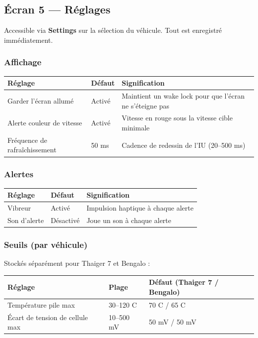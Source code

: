 \documentclass[11pt,a4paper,oneside]{report}
\newcommand{\degC}{\textdegree C}
\begin{document}
\subsection{Écran 5 --- Réglages}
Accessible via \textbf{Settings} sur la sélection du véhicule. Tout est enregistré
immédiatement.

\subsubsection{Affichage}

\begin{tabularx}{\linewidth}{@{}llL@{}}
\toprule
\textbf{Réglage} & \textbf{Défaut} & \textbf{Signification}\\
\midrule
Garder l'écran allumé & Activé & Maintient un wake lock pour que l'écran ne s'éteigne pas\\
Alerte couleur de vitesse & Activé & Vitesse en rouge sous la vitesse cible minimale\\
Fréquence de rafraîchissement & 50 ms & Cadence de redessin de l'IU (20--500 ms)\\
\bottomrule
\end{tabularx}

\subsubsection{Alertes}

\begin{tabularx}{\linewidth}{@{}llL@{}}
\toprule
\textbf{Réglage} & \textbf{Défaut} & \textbf{Signification}\\
\midrule
Vibreur & Activé & Impulsion haptique à chaque alerte\\
Son d'alerte & Désactivé & Joue un son à chaque alerte\\
\bottomrule
\end{tabularx}

\subsubsection{Seuils (par véhicule)}
Stockés séparément pour Thaiger 7 et Bengalo :

\begin{tabularx}{\linewidth}{@{}llL@{}}
\toprule
\textbf{Réglage} & \textbf{Plage} & \textbf{Défaut (Thaiger 7 / Bengalo)}\\
\midrule
Température pile max & 30--120 \degC{} & 70 \degC{} / 65 \degC{}\\
Écart de tension de cellule max & 10--500 mV & 50 mV / 50 mV\\
\bottomrule
\end{tabularx}
\end{document}
